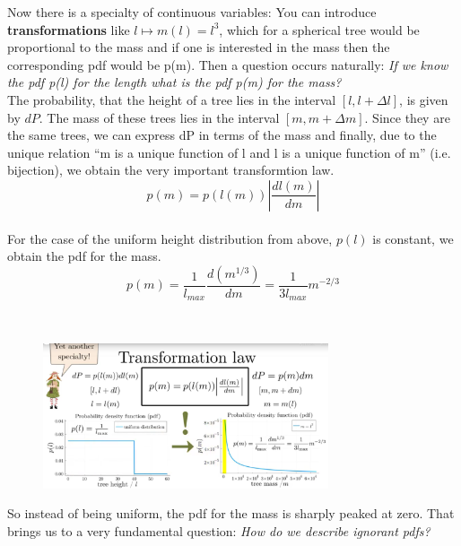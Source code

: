 \documentclass[12pt, a4paper]{scrartcl}
\begin{document}
Now there is a specialty of continuous variables: You can introduce \textbf{transformations} like $l\mapsto m(l)=l^3$, which for a spherical tree would be proportional
to the mass and if one is interested in the mass then the corresponding pdf would be p(m). Then a question occurs naturally: \textit{If we know the pdf p(l) for the length what is the pdf p(m) for the mass?}\\

The probability, that the height of a tree lies in the interval $[l,l+\Delta l]$, is given by $dP$.
The mass of these trees lies in the interval $[m,m+\Delta m]$. Since they are the same trees, we can express dP in terms of the mass and ﬁnally, due to the unique relation ``m is a unique function of l and l is a unique function of m'' (i.e. bijection), we obtain the very important transformtion law.\\
\begin{equation*}\boxed{p(m)=p(l(m))\left|\frac{dl(m)}{dm}\right|
}\end{equation*}\\

For the case of the uniform height distribution from above, $p(l)$ is constant, we
obtain the pdf for the mass. \[p(m)=\frac{1}{l_{max}}\frac{d(m^{1/3})}{dm}=\frac{1}{3l_{max}}m^{-2/3}\]

\\

 \begin{figure}[H]
	\centering
	\includegraphics[width=0.75\textwidth]{8_2.png}
\end{figure}
So instead of being uniform, the pdf for the mass is sharply peaked at zero.
That brings us to a very fundamental question: \textit{How do we describe ignorant pdfs?}\\
\end{document}
